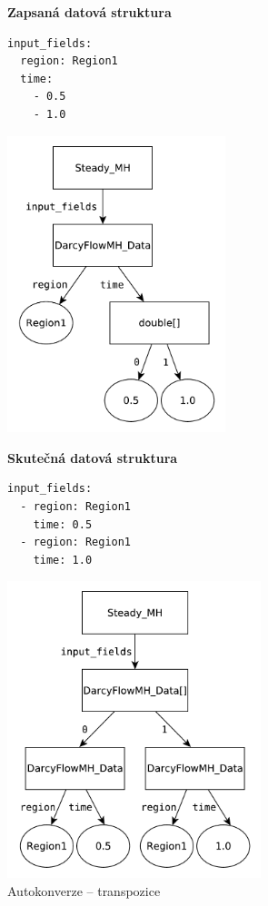 \documentclass[FM,bw,DP]{tulthesis}
\begin{document}
\begin{figure}[ht]
\begin{minipage}[t]{0.45\linewidth}
\vspace{0pt}
\textbf{Zapsaná datová struktura}\\
\vspace{-5pt}
\begin{lstlisting}
input_fields:
  region: Region1
  time:
    - 0.5
    - 1.0
\end{lstlisting}
\vspace{-20pt}
\begin{center}
\includegraphics[height=245pt]{../img/autoconversion_transposition_before.pdf}
\end{center}
\end{minipage}
\quad
\begin{minipage}[t]{0.5\linewidth}
\vspace{0pt}
\textbf{Skutečná datová struktura}\\
\vspace{-5pt}
\begin{lstlisting}
input_fields:
  - region: Region1
    time: 0.5
  - region: Region1
    time: 1.0
\end{lstlisting}
\vspace{-20pt}
\begin{center}
\includegraphics[height=245pt]{../img/autoconversion_transposition_after.pdf}
\end{center}
\end{minipage}
\caption{Autokonverze -- transpozice}
\label{img:autoconversion_transposition}
\end{figure}	
\end{document}
